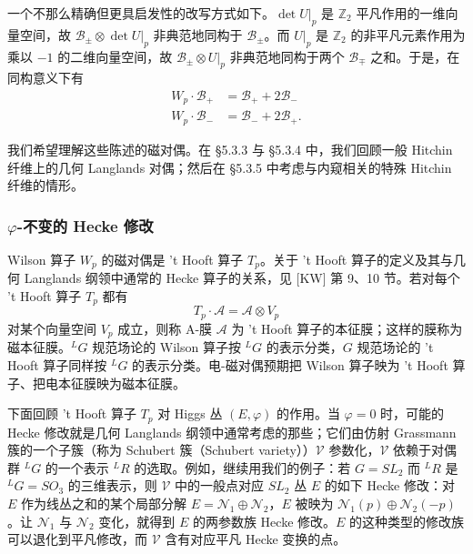 \documentclass[11pt,a4paper]{article}
\begin{document}


一个不那么精确但更具启发性的改写方式如下。$\det U|_p$ 是 $\mathbb{Z}_2$ 平凡作用的一维向量空间，故 $\mathcal{B}_\pm\otimes\det U|_p$ 非典范地同构于 $\mathcal{B}_\pm$。而 $U|_p$ 是 $\mathbb{Z}_2$ 的非平凡元素作用为乘以 $-1$ 的二维向量空间，故 $\mathcal{B}_\pm\otimes U|_p$ 非典范地同构于两个 $\mathcal{B}_\mp$ 之和。于是，在同构意义下有
\begin{equation}\tag{5.24}
\begin{aligned}
W_p\cdot\mathcal{B}_+ &= \mathcal{B}_+ + 2\mathcal{B}_-\\
W_p\cdot\mathcal{B}_- &= \mathcal{B}_- + 2\mathcal{B}_+.
\end{aligned}
\end{equation}

我们希望理解这些陈述的磁对偶。在 §5.3.3 与 §5.3.4 中，我们回顾一般 Hitchin 纤维上的几何 Langlands 对偶；然后在 §5.3.5 中考虑与内窥相关的特殊 Hitchin 纤维的情形。

\subsubsection{\texorpdfstring{$\varphi$}{φ}-不变的 Hecke 修改}

Wilson 算子 $W_p$ 的磁对偶是 't Hooft 算子 $T_p$。关于 't Hooft 算子的定义及其与几何 Langlands 纲领中通常的 Hecke 算子的关系，见 [KW] 第 9、10 节。若对每个 't Hooft 算子 $T_p$ 都有
\begin{equation}\tag{5.25}
T_p\cdot\mathcal{A}=\mathcal{A}\otimes V_p
\end{equation}
对某个向量空间 $V_p$ 成立，则称 A-膜 $\mathcal{A}$ 为 't Hooft 算子的本征膜；这样的膜称为磁本征膜。${}^{L}G$ 规范场论的 Wilson 算子按 ${}^{L}G$ 的表示分类，$G$ 规范场论的 't Hooft 算子同样按 ${}^{L}G$ 的表示分类。电-磁对偶预期把 Wilson 算子映为 't Hooft 算子、把电本征膜映为磁本征膜。

下面回顾 't Hooft 算子 $T_p$ 对 Higgs 丛 $(E,\varphi)$ 的作用。当 $\varphi=0$ 时，可能的 Hecke 修改就是几何 Langlands 纲领中通常考虑的那些；它们由仿射 Grassmann 簇的一个子簇（称为 Schubert 簇（Schubert variety））$\mathcal{V}$ 参数化，$\mathcal{V}$ 依赖于对偶群 ${}^{L}G$ 的一个表示 ${}^{L}R$ 的选取。例如，继续用我们的例子：若 $G=SL_2$ 而 ${}^{L}R$ 是 ${}^{L}G=SO_3$ 的三维表示，则 $\mathcal{V}$ 中的一般点对应 $SL_2$ 丛 $E$ 的如下 Hecke 修改：对 $E$ 作为线丛之和的某个局部分解 $E=\mathcal{N}_1\oplus\mathcal{N}_2$，$E$ 被映为 $\mathcal{N}_1(p)\oplus\mathcal{N}_2(-p)$。让 $\mathcal{N}_1$ 与 $\mathcal{N}_2$ 变化，就得到 $E$ 的两参数族 Hecke 修改。$E$ 的这种类型的修改族可以退化到平凡修改，而 $\mathcal{V}$ 含有对应平凡 Hecke 变换的点。
\end{document}
